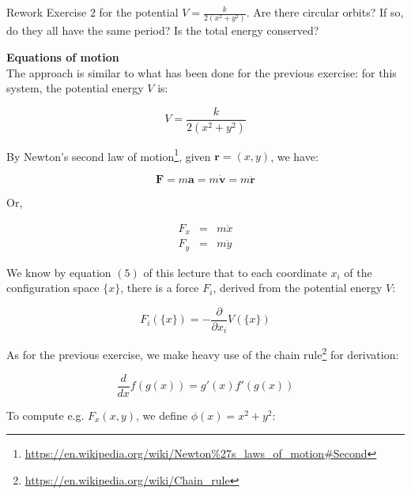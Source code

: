 \documentclass[solutions.tex]{subfiles}
\begin{document}
\maketitle
\begin{exercise}
Rework Exercise $2$ for the potential $V=\frac{k}{2(x^2+y^2)}$.
Are there circular orbits? If so, do they all have the same
period? Is the total energy conserved?
\end{exercise}

\hr
\textbf{Equations of motion}\ \\
The approach is similar to what has been done for the previous
exercise: for this system, the potential energy $V$ is:

\begin{equation}
\label{eqn:L05E03:epot}
V=\frac{k}{2(x^2+y^2)}
\end{equation}

By Newton's second law of
motion\footnote{\url{https://en.wikipedia.org/wiki/Newton\%27s\_laws\_of\_motion\#Second}},
given $\bm{r}=(x,y)$, we have:

\begin{equation}
	\bm{F} = m\bm{a} = m\dot{\bm{v}} = m\ddot{\bm{r}}
\end{equation}

Or,

\begin{equation}
	\label{eqn:L05E03:n2l}
	\begin{aligned}
		F_x &=& m\ddot{x} \\
		F_y &=& m\ddot{y}
	\end{aligned}
\end{equation}

We know by equation $(5)$ of this lecture that to each coordinate
$x_i$ of the configuration space $\{x\}$, there is a force $F_i$,
derived from the potential energy $V$:

\begin{equation}
	F_i(\{x\}) = -\frac{\partial}{\partial x_i}V(\{x\})
\end{equation}

As for the previous exercise, we make heavy use of the
chain rule\footnote{\url{https://en.wikipedia.org/wiki/Chain\_rule}}
for derivation:

\begin{equation}
	\frac{d}{dx}f(g(x)) = g'(x)f'(g(x))
\end{equation}

To compute e.g. $F_x(x,y)$, we define $\phi(x)=x^2+y^2$:
\end{document}
